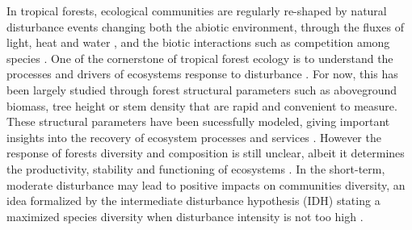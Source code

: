 \documentclass[fleqn,10pt]{ArtEcoFoG} %
\begin{document}
In tropical forests, ecological communities are regularly re-shaped by
natural disturbance events changing both the abiotic environment,
through the fluxes of light, heat and water \citep{Goulamoussene2017},
and the biotic interactions such as competition among species
\citep{Chesson2000, Herault2018}. One of the cornerstone of tropical
forest ecology is to understand the processes and drivers of ecosystems
response to disturbance \citep{White2001, Chazdon2003a}. For now, this
has been largely studied through forest structural parameters such as
aboveground biomass, tree height or stem density
\citep{Piponiot2016, Rutishauser2016} that are rapid and convenient to
measure. These structural parameters have been sucessfully modeled,
giving important insights into the recovery of ecosystem processes and
services \citep{Herault2018}. However the response of forests diversity
and composition is still unclear, albeit it determines the productivity,
stability and functioning of ecosystems \citep{Tilman2014, Liang2016}.
In the short-term, moderate disturbance may lead to positive impacts on
communities diversity, an idea formalized by the intermediate
disturbance hypothesis (IDH) stating a maximized species diversity when
disturbance intensity is not too high
\citep{Molino2001, Kariuki2006a, Berry2008a}.
\end{document}
